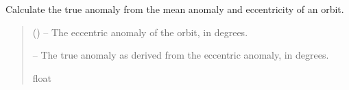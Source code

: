\documentclass[letterpaper,11pt,english]{sphinxmanual}
\begin{document}
\begin{savenotes}\begin{fulllineitems}
\label{\detokenize{code/opihiexarata.orbit.solution:opihiexarata.orbit.solution._calculate_true_anomaly}}
\pysigstartsignatures
{}
\pysigstopsignatures
\sphinxAtStartPar
Calculate the true anomaly from the mean anomaly and eccentricity
of an orbit.
\begin{quote}\begin{description}
\sphinxAtStartPar
{} () – The eccentric anomaly of the orbit, in degrees.

\sphinxAtStartPar
{} – The true anomaly as derived from the eccentric anomaly, in degrees.

\sphinxAtStartPar
float

\end{description}\end{quote}

\end{fulllineitems}\end{savenotes}

\end{document}

